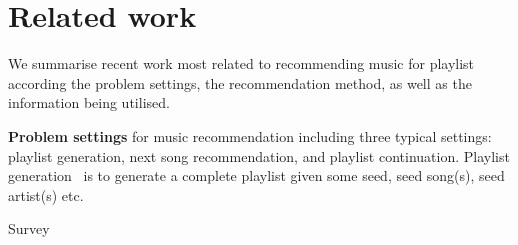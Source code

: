 \section{Related work}
\label{sec:related}

We summarise recent work most related to recommending music for playlist
according the problem settings, the recommendation method,
as well as the information being utilised.

{\bf Problem settings} for music recommendation including three typical settings:
playlist generation, next song recommendation, and playlist continuation.
Playlist generation~\cite{platt2002learning,mcfee2011natural,mcfee2012hypergraph,chen2012playlist,ben2017groove} 
is to generate a complete playlist given some seed, \eg seed song(s), seed artist(s) etc.


Survey~\cite{bonnin2015automated}

